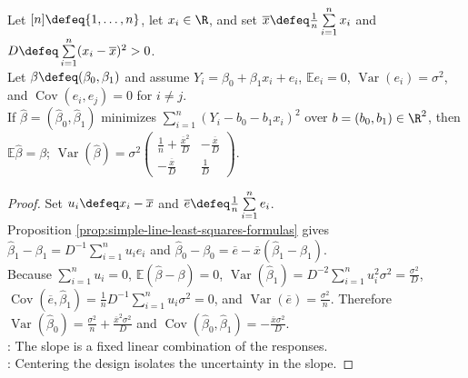 \begin{theorem} \label{thm:simple-regression-unbiased-variance} \\
Let $[n]\defeq\{1,\ldots,n\}$, let $x_i\in\R$, and set $\overline{x}\defeq\frac{1}{n}\sum\limits_{i=1}^{n}x_i$ and $D\defeq\sum\limits_{i=1}^{n}(x_i-\overline{x})^2>0$.\\
Let $\beta\defeq(\beta_0,\beta_1)$ and assume $Y_i=\beta_0+\beta_1x_i+e_i$, $\mathbb{E}e_i=0$, $\operatorname{Var}(e_i)=\sigma^2$, and $\operatorname{Cov}(e_i,e_j)=0$ for $i\neq j$.\\
If $\widehat{\beta}=(\widehat{\beta}_0,\widehat{\beta}_1)$ minimizes $\sum\limits_{i=1}^{n}(Y_i-b_0-b_1x_i)^2$ over $b=(b_0,b_1)\in\R^2$, then $\mathbb{E}\widehat{\beta}=\beta$; $\operatorname{Var}(\widehat{\beta})=\sigma^2\begin{pmatrix}\frac{1}{n}+\frac{\overline{x}^2}{D} & -\frac{\overline{x}}{D}\\ -\frac{\overline{x}}{D} & \frac{1}{D}\end{pmatrix}$.
\begin{proof}
Set $u_i\defeq x_i-\overline{x}$ and $\overline{e}\defeq \frac{1}{n}\sum\limits_{i=1}^{n}e_i$. \\
Proposition \ref{prop:simple-line-least-squares-formulas} gives $\widehat{\beta}_1-\beta_1=D^{-1}\sum\limits_{i=1}^{n}u_ie_i$ and $\widehat{\beta}_0-\beta_0=\overline{e}-\overline{x}(\widehat{\beta}_1-\beta_1)$.\\
Because $\sum\limits_{i=1}^{n}u_i=0$, $\mathbb{E}(\widehat{\beta}-\beta)=0$, $\operatorname{Var}(\widehat{\beta}_1)=D^{-2}\sum\limits_{i=1}^{n}u_i^2\sigma^2=\frac{\sigma^2}{D}$, $\operatorname{Cov}(\overline{e},\widehat{\beta}_1)=\frac{1}{n}D^{-1}\sum\limits_{i=1}^{n}u_i\sigma^2=0$, and $\operatorname{Var}(\overline{e})=\frac{\sigma^2}{n}$. Therefore $\operatorname{Var}(\widehat{\beta}_0)=\frac{\sigma^2}{n}+\frac{\overline{x}^2\sigma^2}{D}$ and $\operatorname{Cov}(\widehat{\beta}_0,\widehat{\beta}_1)=-\frac{\overline{x}\sigma^2}{D}$.\\
: The slope is a fixed linear combination of the responses.\\
: Centering the design isolates the uncertainty in the slope.
\end{proof}
\end{theorem}

